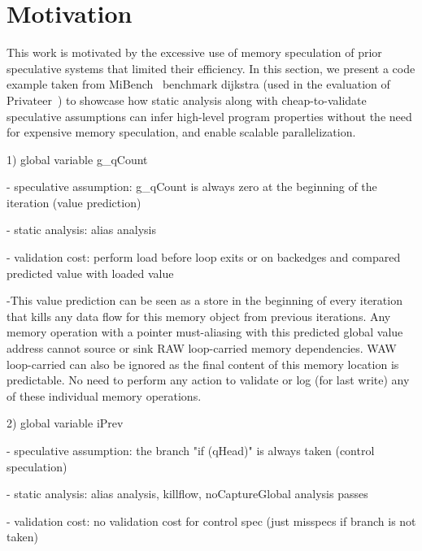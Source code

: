 \section{Motivation}
\label{sec:motivation}

This work is motivated by the excessive use of memory speculation of
prior speculative systems that limited their efficiency.
%
In this section, we present a code example taken from MiBench~\cite{} benchmark
dijkstra (used in the evaluation of Privateer~\cite{}) to showcase how static
analysis along with cheap-to-validate speculative assumptions can infer
high-level program properties without the need for expensive memory speculation,
and enable scalable parallelization.

\lstset{basicstyle=\ttfamily, numbers=left, numberstyle=\tiny,
  stepnumber=1, numbersep=5pt}
\begin{figure*}[t]
  \centering
  \scriptsize
  \subfloat[dijkstra]
  {
    \label{fig:dijkstra}
    \begin{minipage}{7.5cm}
      
    \end{minipage}
  }
\end{figure*}

1) global variable g\_qCount

- speculative assumption:  g\_qCount is always zero at the beginning of the
iteration (value prediction)

- static analysis: alias analysis

- validation cost: perform load before loop exits or on backedges and compared
  predicted value with loaded value

-This value prediction can be seen as a store in the beginning of every
iteration that kills any data flow for this memory object from previous
iterations.  Any memory operation with a pointer must-aliasing with this
predicted global value address cannot source or sink RAW loop-carried memory
dependencies.  WAW loop-carried can also be ignored as the final content of this
memory location is predictable.  No need to perform any action to validate or
log (for last write) any of these individual memory operations.

2) global variable iPrev

- speculative assumption: the branch "if (qHead)" is always taken (control speculation)

- static analysis: alias analysis, killflow, noCaptureGlobal analysis passes

- validation cost: no validation cost for control spec (just misspecs if branch
  is not taken)

